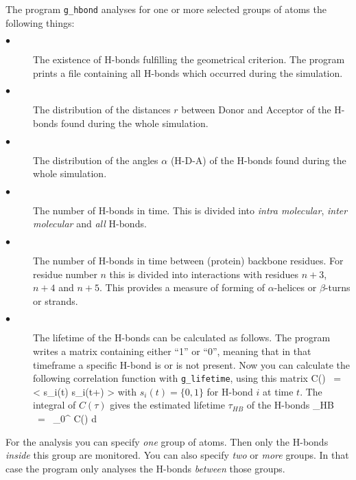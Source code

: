 The program {\tt g\_hbond} analyses for one or more selected groups of atoms 
the following things:
\begin{description}
\item[$\bullet$]
The existence of H-bonds fulfilling the geometrical criterion. The program 
prints a file containing all H-bonds which occurred during the simulation. 
\item[$\bullet$]
The distribution of the distances $r$ between Donor and Acceptor of the 
H-bonds found during the whole simulation.
\item[$\bullet$]
The distribution of the angles $\alpha$ (H-D-A) of the 
H-bonds found during the whole simulation.
\item[$\bullet$]
The number of H-bonds in time. This is divided into 
{\em intra molecular}, {\em inter molecular} and {\em all} H-bonds. 
\item[$\bullet$]
The number of H-bonds in time between (protein) backbone residues. 
For residue number $n$ this is divided into interactions with 
residues $n+3$, $n+4$ and $n+5$. This provides a measure of forming of 
$\alpha$-helices or $\beta$-turns or strands.
\item[$\bullet$]
The lifetime of the H-bonds can be calculated as follows. The program writes 
a matrix containing either ``1'' or ``0'', meaning that in that timeframe a 
specific H-bond is or is not present. Now you can calculate the following 
correlation function with {\tt g\_lifetime}, using this matrix
\beq
C(\tau) ~=~ < s_i(t)\; s_i(t\:+\:\tau) >
\label{eq:hbcorr}
\eeq
with $s_i(t) = \{0,1\}$ for H-bond $i$ at time $t$. The integral of $C(\tau)$ 
gives the estimated lifetime $\tau_{HB}$ of the H-bonds
\beq
\tau_{HB} ~=~ \int_{0}^{\infty} C(\tau) d\tau
\label{eq:hblife}
\eeq
\end{description}

For the analysis you can specify {\em one} group of atoms. Then only the 
H-bonds {\em inside} this group are monitored. You can also specify {\em two} 
or {\em more} groups. In that case the program only analyses the H-bonds 
{\em between} those groups. 

